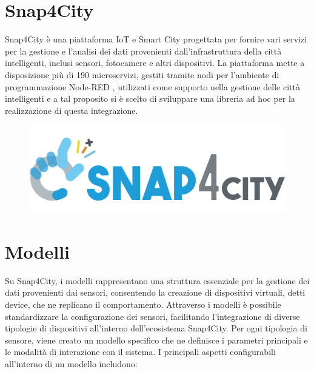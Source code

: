 \documentclass[a4paper, openright, thesis]{report}
\begin{document}
\section{Snap4City} \label{snap4}
Snap4City è una piattaforma IoT e Smart City \cite{snap} progettata per fornire vari servizi
per la gestione e l'analisi dei dati provenienti dall'infrastruttura della città intelligenti, inclusi
sensori, fotocamere e altri dispositivi.
La piattaforma mette a disposizione più di 190 microservizi, gestiti tramite nodi per l’ambiente di
programmazione Node-RED \cite{nodered}, utilizzati come supporto nella gestione delle città intelligenti e a tal
proposito si è scelto di sviluppare una libreria ad hoc per la realizzazione di questa
integrazione.
\begin{figure}[H]
    \centering
    \includegraphics[width = 0.7\linewidth]{img/logo.png}
\end{figure}


\section{Modelli}

Su Snap4City, i modelli rappresentano una struttura essenziale per la gestione dei dati provenienti dai sensori, consentendo la creazione di dispositivi virtuali, detti device, che ne replicano il comportamento. Attraverso i modelli è possibile standardizzare la configurazione dei sensori, facilitando l'integrazione di diverse tipologie di dispositivi all'interno dell'ecosistema Snap4City. Per ogni tipologia di sensore, viene creato un modello specifico che ne definisce i parametri principali e le modalità di interazione con il sistema.
I principali aspetti configurabili all'interno di un modello includono:
\end{document}
